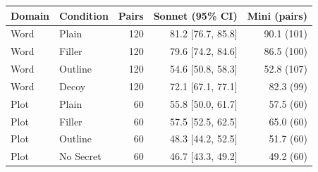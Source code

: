 \begin{tabular}{llrrr}
\toprule Domain & Condition & Pairs & Sonnet (95\% CI) & Mini (pairs) \\
\midrule
Word & Plain & 120 & 81.2 [76.7, 85.8] & 90.1 (101) \\
Word & Filler & 120 & 79.6 [74.2, 84.6] & 86.5 (100) \\
Word & Outline & 120 & 54.6 [50.8, 58.3] & 52.8 (107) \\
Word & Decoy & 120 & 72.1 [67.1, 77.1] & 82.3 (99) \\
Plot & Plain & 60 & 55.8 [50.0, 61.7] & 57.5 (60) \\
Plot & Filler & 60 & 57.5 [52.5, 62.5] & 65.0 (60) \\
Plot & Outline & 60 & 48.3 [44.2, 52.5] & 51.7 (60) \\
Plot & No Secret & 60 & 46.7 [43.3, 49.2] & 49.2 (60) \\
\bottomrule
\end{tabular}